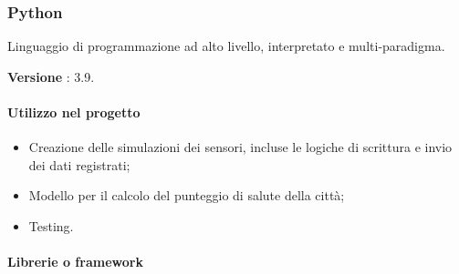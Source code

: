 \subsubsection{Python}
Linguaggio di programmazione ad alto livello, interpretato e multi-paradigma.

\textbf{Versione} : 3.9.

\paragraph{Utilizzo nel progetto} 
\begin{itemize}
    \item Creazione delle simulazioni dei sensori, incluse le logiche di scrittura e invio dei dati registrati;
    \item Modello per il calcolo del punteggio di salute della città;
    \item Testing.
\end{itemize}

\paragraph{Librerie o framework}

